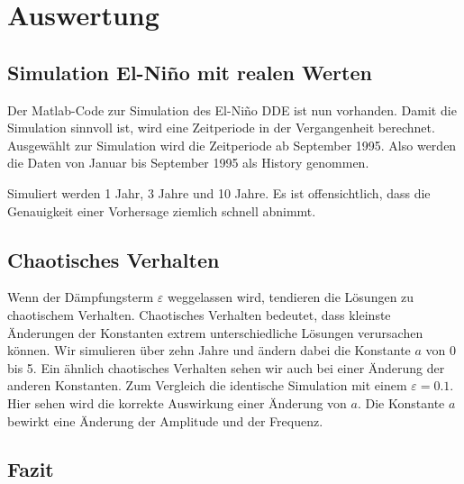 \section{Auswertung}
\subsection{Simulation El-Niño mit realen Werten}
Der Matlab-Code zur Simulation des El-Niño DDE ist nun vorhanden.
Damit die Simulation sinnvoll ist, wird eine Zeitperiode in der Vergangenheit berechnet.
Ausgewählt zur Simulation wird die Zeitperiode ab September 1995. 
Also werden die Daten von Januar bis September 1995 als History genommen.

Simuliert werden 1 Jahr, 3 Jahre und 10 Jahre.
Es ist offensichtlich, dass die Genauigkeit einer Vorhersage ziemlich schnell abnimmt.

\subsection{Chaotisches Verhalten}
Wenn der Dämpfungsterm $\varepsilon$ weggelassen wird, tendieren die Lösungen zu chaotischem Verhalten.
Chaotisches Verhalten bedeutet, dass kleinste Änderungen der Konstanten extrem unterschiedliche Lösungen verursachen können. 
Wir simulieren über zehn Jahre und ändern dabei die Konstante $a$ von 0 bis 5.
Ein ähnlich chaotisches Verhalten sehen wir auch bei einer Änderung der anderen Konstanten.
Zum Vergleich die identische Simulation mit einem $\varepsilon = 0.1$. 
Hier sehen wird die korrekte Auswirkung einer Änderung von $a$.
Die Konstante $a$ bewirkt eine Änderung der Amplitude und der Frequenz.


\subsection{Fazit}
